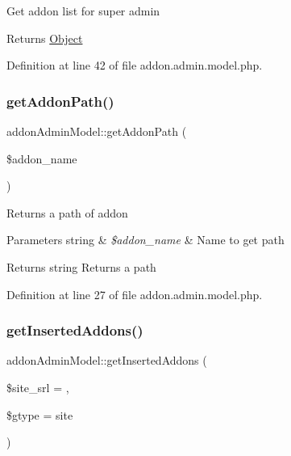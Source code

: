 Get addon list for super admin

\begin{DoxyReturn}{Returns}
\hyperlink{classObject}{Object} 
\end{DoxyReturn}


Definition at line 42 of file addon.\+admin.\+model.\+php.

\hypertarget{classaddonAdminModel_ab4fea679a0059be718e449b31a88c46f}{}\label{classaddonAdminModel_ab4fea679a0059be718e449b31a88c46f} 
\subsubsection{\texorpdfstring{get\+Addon\+Path()}{getAddonPath()}}
{\footnotesize\ttfamily addon\+Admin\+Model\+::get\+Addon\+Path (\begin{DoxyParamCaption}\item[{}]{\$addon\+\_\+name }\end{DoxyParamCaption})}

Returns a path of addon


\begin{DoxyParams}[1]{Parameters}
string & {\em \$addon\+\_\+name} & Name to get path \\
\hline
\end{DoxyParams}
\begin{DoxyReturn}{Returns}
string Returns a path 
\end{DoxyReturn}


Definition at line 27 of file addon.\+admin.\+model.\+php.

\hypertarget{classaddonAdminModel_a3887ceb3d0d09c833df26669d2ce4f96}{}\label{classaddonAdminModel_a3887ceb3d0d09c833df26669d2ce4f96} 
\subsubsection{\texorpdfstring{get\+Inserted\+Addons()}{getInsertedAddons()}}
{\footnotesize\ttfamily addon\+Admin\+Model\+::get\+Inserted\+Addons (\begin{DoxyParamCaption}\item[{}]{\$site\+\_\+srl = {},  }\item[{}]{\$gtype = {\ttfamily \textquotesingle{}site\textquotesingle{}} }\end{DoxyParamCaption})}

